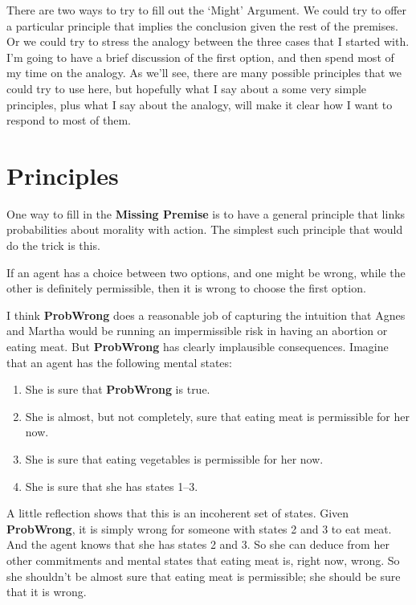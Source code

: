 \documentclass[
  11pt,
  letterpaper,
  DIV=11,
  numbers=noendperiod,
  twoside]{scrartcl}
\providecommand{\tightlist}{%
  \setlength{\itemsep}{0pt}\setlength{\parskip}{0pt}}
\begin{document}
There are two ways to try to fill out the `Might' Argument. We could try
to offer a particular principle that implies the conclusion given the
rest of the premises. Or we could try to stress the analogy between the
three cases that I started with. I'm going to have a brief discussion of
the first option, and then spend most of my time on the analogy. As
we'll see, there are many possible principles that we could try to use
here, but hopefully what I say about a some very simple principles, plus
what I say about the analogy, will make it clear how I want to respond
to most of them.

\section{Principles}\label{principles}

One way to fill in the \textbf{Missing Premise} is to have a general
principle that links probabilities about morality with action. The
simplest such principle that would do the trick is this.

\begin{description}
\tightlist
\item[ProbWrong]
If an agent has a choice between two options, and one might be wrong,
while the other is definitely permissible, then it is wrong to choose
the first option.
\end{description}

I think \textbf{ProbWrong} does a reasonable job of capturing the
intuition that Agnes and Martha would be running an impermissible risk
in having an abortion or eating meat. But \textbf{ProbWrong} has clearly
implausible consequences. Imagine that an agent has the following mental
states:

\begin{enumerate}
\def\labelenumi{\arabic{enumi}.}
\tightlist
\item
  She is sure that \textbf{ProbWrong} is true.
\item
  She is almost, but not completely, sure that eating meat is
  permissible for her now.
\item
  She is sure that eating vegetables is permissible for her now.
\item
  She is sure that she has states 1--3.
\end{enumerate}

A little reflection shows that this is an incoherent set of states.
Given \textbf{ProbWrong}, it is simply wrong for someone with states 2
and 3 to eat meat. And the agent knows that she has states 2 and 3. So
she can deduce from her other commitments and mental states that eating
meat is, right now, wrong. So she shouldn't be almost sure that eating
meat is permissible; she should be sure that it is wrong.
\end{document}
